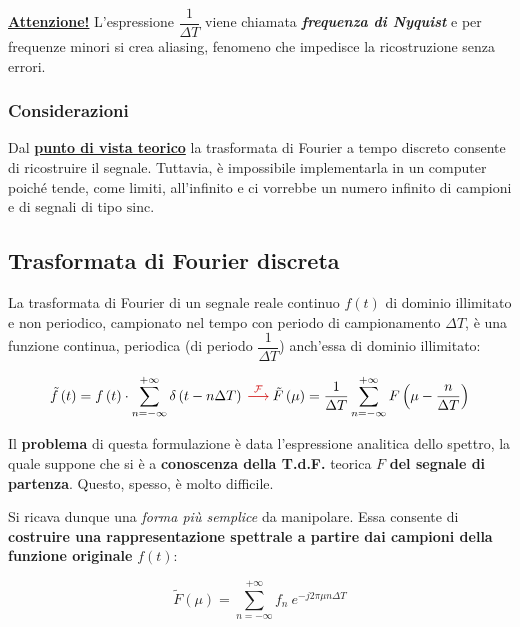 \documentclass[a4paper]{article}
\begin{document}
	\noindent
	\textbf{\underline{Attenzione!}} L'espressione $\dfrac{1}{\Delta T}$ viene chiamata \textbf{\emph{frequenza di Nyquist}} e per frequenze minori si crea aliasing, fenomeno che impedisce la ricostruzione senza errori.
	
	\subsubsection{Considerazioni}
	
	Dal \textbf{\underline{punto di vista teorico}} la trasformata di Fourier a tempo discreto consente di ricostruire il segnale. Tuttavia, è impossibile implementarla in un computer poiché tende, come limiti, all'infinito e ci vorrebbe un numero infinito di campioni e di segnali di tipo $\mathrm{sinc}$.
	
	\newpage
	
	\subsection{Trasformata di Fourier discreta}\label{trasformata di fourier discreta}
	
	La trasformata di Fourier di un segnale reale continuo $f\left(t\right)$ di dominio illimitato e non periodico, campionato nel tempo con periodo di campionamento $\Delta T$, è una funzione continua, periodica (di periodo $\dfrac{1}{\Delta T}$) anch'essa di dominio illimitato:
	
	\begin{equation*}
		\tilde{f}\left(t\right) = f\left(t\right) \cdot \sum_{n = -\infty}^{+\infty}\delta\left(t - n\Delta T\right) \: \textcolor{Red3}{\overset{\mathcal{F}}{\longrightarrow}} \: \tilde{F}\left(\mu\right) = \dfrac{1}{\Delta T} \sum_{n = -\infty}^{+\infty} F\left(\mu - \dfrac{n}{\Delta T}\right)
	\end{equation*}

	\noindent
	Il \textbf{problema} di questa formulazione è data l'espressione analitica dello spettro, la quale suppone che si è a \textbf{conoscenza della T.d.F.} teorica $F$ \textbf{del segnale di partenza}. Questo, spesso, è molto difficile.\newline
	
	\noindent
	Si ricava dunque una \emph{forma più semplice} da manipolare. Essa consente di \textbf{costruire una rappresentazione spettrale a partire dai campioni della funzione originale} $f\left(t\right)$:
	
	\begin{equation*}
		\tilde{F}\left(\mu\right) = \sum_{n = -\infty}^{+\infty} f_{n} \: e^{-j 2 \pi \mu n \Delta T}
	\end{equation*}
	
\end{document}
